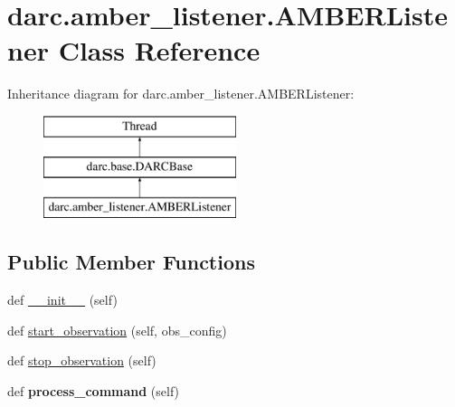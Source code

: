 \hypertarget{classdarc_1_1amber__listener_1_1_a_m_b_e_r_listener}{}\section{darc.\+amber\+\_\+listener.\+A\+M\+B\+E\+R\+Listener Class Reference}
\label{classdarc_1_1amber__listener_1_1_a_m_b_e_r_listener}
Inheritance diagram for darc.\+amber\+\_\+listener.\+A\+M\+B\+E\+R\+Listener\+:\begin{figure}[H]
\begin{center}
\leavevmode
\includegraphics[height=3.000000cm]{classdarc_1_1amber__listener_1_1_a_m_b_e_r_listener}
\end{center}
\end{figure}
\subsection*{Public Member Functions}
\begin{DoxyCompactItemize}
\item 
def \mbox{\hyperlink{classdarc_1_1amber__listener_1_1_a_m_b_e_r_listener_a00dc17e121f7cc52ec1f5b455d4d1ef1}{\+\_\+\+\_\+init\+\_\+\+\_\+}} (self)
\item 
def \mbox{\hyperlink{classdarc_1_1amber__listener_1_1_a_m_b_e_r_listener_a153eb430fc7b0f2b7c0f9537379ac914}{start\+\_\+observation}} (self, obs\+\_\+config)
\item 
def \mbox{\hyperlink{classdarc_1_1amber__listener_1_1_a_m_b_e_r_listener_a1f4eddb8601418ccb48057f3ae42dd0f}{stop\+\_\+observation}} (self)
\item 
\mbox{\label{classdarc_1_1amber__listener_1_1_a_m_b_e_r_listener_a4cec4b7669c55db11e78e13cb81a08b3}} 
def {\bfseries process\+\_\+command} (self)
\end{DoxyCompactItemize}
